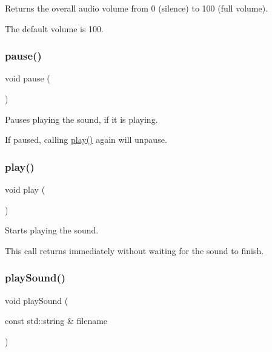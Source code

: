 Returns the overall audio volume from 0 (silence) to 100 (full volume). 

The default volume is 100. \mbox{\label{classGSound_a7167f5c196fc5e167bfabde1a730e81d}} 
\subsubsection{\texorpdfstring{pause()}{pause()}}
{\footnotesize\ttfamily void pause (\begin{DoxyParamCaption}{ }\end{DoxyParamCaption})\hspace{0.3cm}{\ttfamily [static]}}



Pauses playing the sound, if it is playing. 

If paused, calling \mbox{\hyperlink{classGSound_a6d58098c6cf63c241ed03bc797256bb1}{play()}} again will unpause. \mbox{\label{classGSound_a6d58098c6cf63c241ed03bc797256bb1}} 
\subsubsection{\texorpdfstring{play()}{play()}}
{\footnotesize\ttfamily void play (\begin{DoxyParamCaption}{ }\end{DoxyParamCaption})}



Starts playing the sound. 

This call returns immediately without waiting for the sound to finish. \mbox{\label{classGSound_a33b24517799bad56a19cfe26b3f962ae}} 
\subsubsection{\texorpdfstring{play\+Sound()}{playSound()}}
{\footnotesize\ttfamily void play\+Sound (\begin{DoxyParamCaption}\item[{const std\+::string \&}]{filename }\end{DoxyParamCaption})\hspace{0.3cm}{\ttfamily [static]}}



